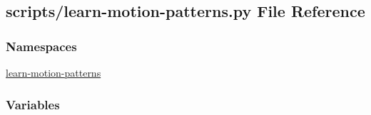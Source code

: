 \hypertarget{learn-motion-patterns_8py}{\subsection{scripts/learn-\/motion-\/patterns.py File Reference}
\label{learn-motion-patterns_8py}
}
\subsubsection*{Namespaces}
\begin{DoxyCompactItemize}
\item 
\hyperlink{namespacelearn-motion-patterns}{learn-\/motion-\/patterns}
\end{DoxyCompactItemize}
\subsubsection*{Variables}
